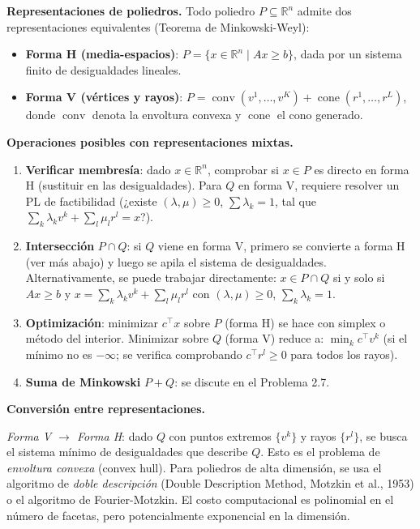 \documentclass{article}
\begin{document}
\textbf{Representaciones de poliedros.} Todo poliedro $P \subseteq \mathbb{R}^n$ admite dos representaciones equivalentes (Teorema de Minkowski-Weyl):
\begin{itemize}
\item \textbf{Forma H (media-espacios)}: $P = \{x \in \mathbb{R}^n \mid Ax \geq b\}$, dada por un sistema finito de desigualdades lineales.
\item \textbf{Forma V (vértices y rayos)}: $P = \operatorname{conv}(v^1,\ldots,v^K) + \operatorname{cone}(r^1,\ldots,r^L)$, donde $\operatorname{conv}$ denota la envoltura convexa y $\operatorname{cone}$ el cono generado.
\end{itemize}

\textbf{Operaciones posibles con representaciones mixtas.}

\begin{enumerate}[1.]
\item \textbf{Verificar membresía}: dado $x \in \mathbb{R}^n$, comprobar si $x \in P$ es directo en forma H (sustituir en las desigualdades). Para $Q$ en forma V, requiere resolver un PL de factibilidad (¿existe $(\lambda,\mu) \geq 0$, $\sum \lambda_k = 1$, tal que $\sum_k \lambda_k v^k + \sum_l \mu_l r^l = x$?).

\item \textbf{Intersección} $P \cap Q$: si $Q$ viene en forma V, primero se convierte a forma H (ver más abajo) y luego se apila el sistema de desigualdades. Alternativamente, se puede trabajar directamente: $x \in P \cap Q$ si y solo si $Ax \geq b$ y $x = \sum_k \lambda_k v^k + \sum_l \mu_l r^l$ con $(\lambda,\mu) \geq 0$, $\sum_k \lambda_k = 1$.

\item \textbf{Optimización}: minimizar $c^\top x$ sobre $P$ (forma H) se hace con simplex o método del interior. Minimizar sobre $Q$ (forma V) reduce a: $\min_k c^\top v^k$ (si el mínimo no es $-\infty$; se verifica comprobando $c^\top r^l \geq 0$ para todos los rayos).

\item \textbf{Suma de Minkowski} $P + Q$: se discute en el Problema 2.7.
\end{enumerate}

\textbf{Conversión entre representaciones.}

\textit{Forma V $\to$ Forma H}: dado $Q$ con puntos extremos $\{v^k\}$ y rayos $\{r^l\}$, se busca el sistema mínimo de desigualdades que describe $Q$. Esto es el problema de \emph{envoltura convexa} (convex hull). Para poliedros de alta dimensión, se usa el algoritmo de \emph{doble descripción} (Double Description Method, Motzkin et al., 1953) o el algoritmo de Fourier-Motzkin. El costo computacional es polinomial en el número de facetas, pero potencialmente exponencial en la dimensión.
\end{document}
